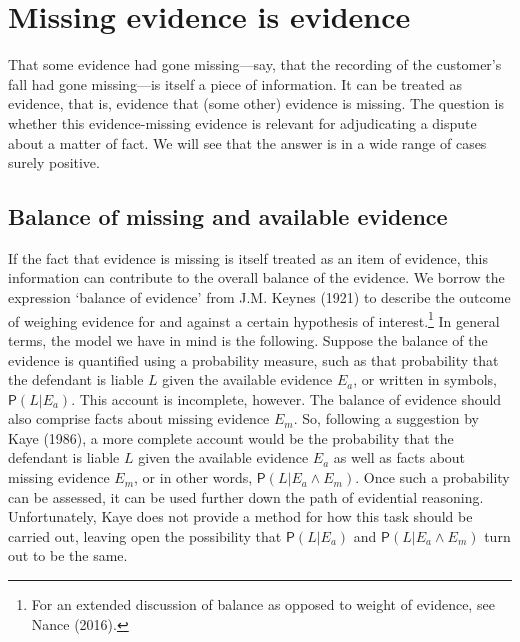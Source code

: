 \documentclass[
  10pt,
  dvipsnames,enabledeprecatedfontcommands]{scrartcl}
\newcommand{\pr}[1]{\mathsf{P}(#1)}
\begin{document}
\hypertarget{missing-evidence-is-evidence}{%
\section{Missing evidence is
evidence}\label{missing-evidence-is-evidence}}

\label{sec:missing-evidence-evidence}

That some evidence had gone missing---say, that the recording of the
customer's fall had gone missing---is itself a piece of information. It
can be treated as evidence, that is, evidence that (some other) evidence
is missing. The question is whether this evidence-missing evidence is
relevant for adjudicating a dispute about a matter of fact. We will see
that the answer is in a wide range of cases surely positive.

\hypertarget{balance-of-missing-and-available-evidence}{%
\subsection{Balance of missing and available
evidence}\label{balance-of-missing-and-available-evidence}}

If the fact that evidence is missing is itself treated as an item of
evidence, this information can contribute to the overall balance of the
evidence. We borrow the expression `balance of evidence' from J.M.
Keynes (1921) to describe the outcome of weighing evidence for and
against a certain hypothesis of interest.\footnote{For an extended
  discussion of balance as opposed to weight of evidence, see Nance
  (2016).} In general terms, the model we have in mind is the following.
Suppose the balance of the evidence is quantified using a probability
measure, such as that probability that the defendant is liable \(L\)
given the available evidence \(E_a\), or written in symbols,
\(\pr{L \vert E_a}\). This account is incomplete, however. The balance
of evidence should also comprise facts about missing evidence \(E_m\).
So, following a suggestion by Kaye (1986), a more complete account would
be the probability that the defendant is liable \(L\) given the
available evidence \(E_a\) as well as facts about missing evidence
\(E_m\), or in other words, \(\pr{L \vert E_a \wedge E_m}\). Once such a
probability can be assessed, it can be used further down the path of
evidential reasoning. Unfortunately, Kaye does not provide a method for
how this task should be carried out, leaving open the possibility that
\(\pr{L \vert E_a}\) and \(\pr{L \vert E_a \wedge E_m}\) turn out to be
the same.
\end{document}
